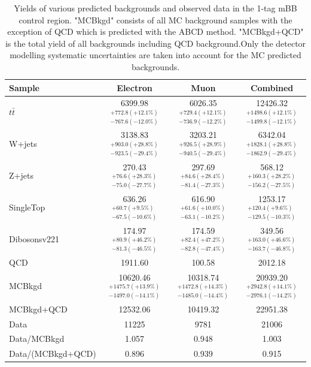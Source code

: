 \renewcommand{\arraystretch}{1.5}
\begin{table}
\begin{center}
\begin{tabular}{l|c|c|c}
Sample           & Electron      & Muon        & Combined     \\ 
\hline
$t\bar{t}$        & 6399.98 $^{+772.8(+12.1\%)}_{-767.6(-12.0\%)}$  & 6026.35 $^{+729.4(+12.1\%)}_{-736.9(-12.2\%)}$  & 12426.32   $^{+1498.6(+12.1\%)}_{-1499.8(-12.1\%)}$  \\
W+jets            & 3138.83 $^{+903.0(+28.8\%)}_{-923.5(-29.4\%)}$  & 3203.21 $^{+926.5(+28.9\%)}_{-940.5(-29.4\%)}$  & 6342.04    $^{+1828.1(+28.8\%)}_{-1862.9(-29.4\%)}$  \\
Z+jets            & 270.43  $^{+76.6(+28.3\%)}_{-75.0(-27.7\%)}$    & 297.69  $^{+84.6(+28.4\%)}_{-81.4(-27.3\%)}$    & 568.12     $^{+160.3(+28.2\%)}_{-156.2(-27.5\%)}$  \\
SingleTop         & 636.26  $^{+60.7(+9.5\%)}_{-67.5(-10.6\%)}$     & 616.90  $^{+61.6(+10.0\%)}_{-63.1(-10.2\%)}$    & 1253.17    $^{+120.4(+9.6\%)}_{-129.5(-10.3\%)}$  \\
Dibosonsv221      & 174.97  $^{+80.9(+46.2\%)}_{-81.3(-46.5\%)}$    & 174.59  $^{+82.4(+47.2\%)}_{-82.8(-47.4\%)}$    & 349.56     $^{+163.0(+46.6\%)}_{-163.7(-46.8\%)}$  \\
QCD               & 1911.60      & 100.58       & 2012.18     \\
\hline
MCBkgd            & 10620.46 $^{+1475.7(+13.9\%)}_{-1497.0(-14.1\%)}$  & 10318.74 $^{+1472.8(+14.3\%)}_{-1485.0(-14.4\%)}$      & 20939.20 $^{+2942.8(+14.1\%)}_{-2976.1(-14.2\%)}$  \\
MCBkgd+QCD        & 12532.06     & 10419.32     & 22951.38    \\
Data              & 11225        & 9781         & 21006       \\
\hline
Data/MCBkgd       & 1.057        & 0.948        & 1.003       \\
Data/(MCBkgd+QCD) & 0.896        & 0.939        & 0.915       \\
\end{tabular}
\end{center}
\caption{Yields of various predicted backgrounds and observed data in the 1-tag mBB control region. "MCBkgd" consists
of all MC background samples with the exception of QCD which is predicted with the ABCD method. "MCBkgd+QCD" is 
the total yield of all backgrounds including QCD background.Only the detector modelling systematic uncertainties are taken
into account for the MC predicted backgrounds.}
\label{tab:boosted_bkgd_1tag0bjet_abcd_a_mbbcr}
\end{table}
\renewcommand{\arraystretch}{1.0}


